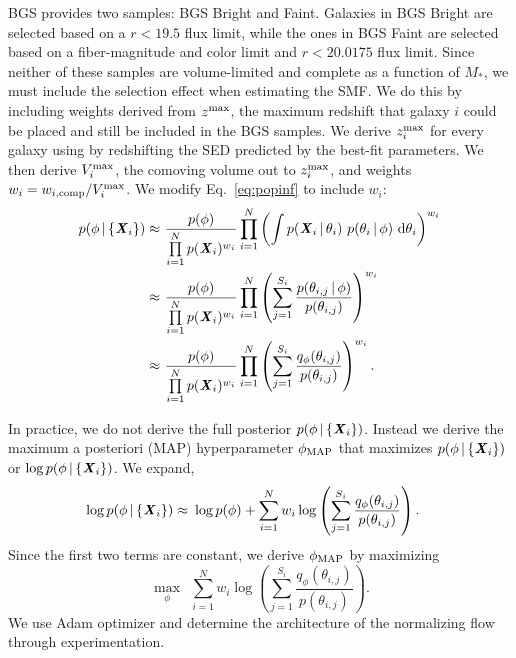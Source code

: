 BGS provides two samples: BGS Bright and Faint. 
Galaxies in BGS Bright are selected based on a $r < 19.5$ flux limit, while
the ones in BGS Faint are selected based on a fiber-magnitude and color limit
and $r < 20.0175$ flux limit. 
Since neither of these samples are volume-limited and complete as a function
of $M_*$, we must include the selection effect when estimating the SMF. 
We do this by including weights derived from $z^{\rm max}$, the maximum
redshift that galaxy $i$ could be placed and still be included in the BGS
samples. 
We derive $z^{\rm max}_i$ for every galaxy using by redshifting the SED
predicted by the best-fit parameters. 
We then derive $V^{\rm max}_i$, the comoving volume out to $z^{\rm max}_i$, and
weights $w_i = w_{i, {\rm comp}}/V^{\rm max}_i$. 
We modify Eq.~\ref{eq:popinf} to include $w_i$: 
\begin{align}
p(\phi \,|\, \{{\textbf{\textit{X}}_i}\}) 
    \approx&~\frac{p(\phi)}{\prod\limits_{i=1}^N p({\textbf{\textit{X}}_i})^{w_i}} 
    \prod\limits_{i=1}^N \left(\int p({\textbf{\textit{X}}_i} \,|\, \theta_i)~p(\theta_i \,|\, \phi)~{\rm d}\theta_i \right)^{w_i} \\ 
    \approx&~\frac{p(\phi)}{\prod\limits_{i=1}^N p({\textbf{\textit{X}}_i})^{w_i}} 
    \prod\limits_{i=1}^N \left( \sum\limits_{j=1}^{S_i}
    \frac{p(\theta_{i,j} \,|\, \phi)}{p(\theta_{i,j})} \right)^{w_i} \\
    \approx&~\frac{p(\phi)}{\prod\limits_{i=1}^N p({\textbf{\textit{X}}_i})^{w_i}} 
    \prod\limits_{i=1}^N \left( \sum\limits_{j=1}^{S_i}
    \frac{q_\phi(\theta_{i,j})}{p(\theta_{i,j})} \right)^{w_i}.
\end{align} 

In practice, we do not derive the full posterior 
$p(\phi \,|\, \{{\textbf{\textit{X}}_i}\})$. 
Instead we derive the maximum a posteriori (MAP) hyperparameter 
$\phi_{\rm MAP}$ that maximizes $p(\phi \,|\, \{{\textbf{\textit{X}}_i}\})$ or 
$\log p(\phi \,|\, \{{\textbf{\textit{X}}_i}\})$.
We expand, 
\begin{align}
\log p(\phi \given \{{\bfi X_i}\}) 
    \approx&~\log p(\phi) + %
    \sum\limits_{i=1}^N w_i \log \left(\sum\limits_{j=1}^{S_i} \frac{q_\phi(\theta_{i,j})}{p(\theta_{i,j})} \right).
\end{align} 
Since the first two terms are constant, we derive $\phi_{\rm MAP}$ by
maximizing 
\begin{equation}
    \max_\phi~~\sum\limits_{i=1}^N w_i \log \left(\sum\limits_{j=1}^{S_i} \frac{q_\phi(\theta_{i,j})}{p(\theta_{i,j})} \right).
\end{equation}
We use {\sc Adam} optimizer and determine the architecture of the normalizing
flow through experimentation.  


